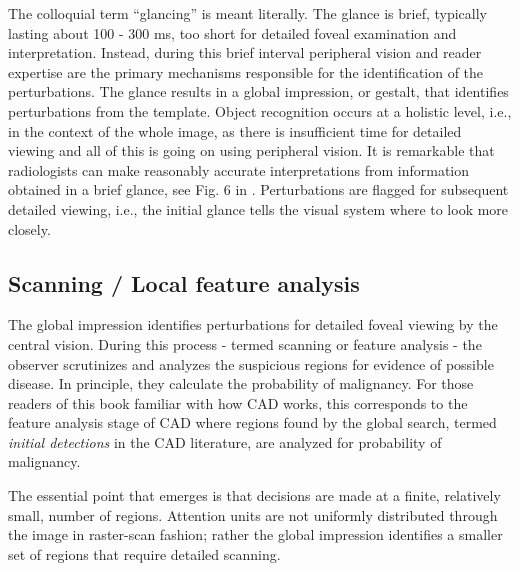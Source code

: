 \documentclass[
]{book}
\begin{document}
The colloquial term ``glancing'' is meant literally. The glance is brief, typically lasting about 100 - 300 ms, too short for detailed foveal examination and interpretation. Instead, during this brief interval peripheral vision and reader expertise are the primary mechanisms responsible for the identification of the perturbations. The glance results in a global impression, or gestalt, that identifies perturbations from the template. Object recognition occurs at a holistic level, i.e., in the context of the whole image, as there is insufficient time for detailed viewing and all of this is going on using peripheral vision. It is remarkable that radiologists can make reasonably accurate interpretations from information obtained in a brief glance, see Fig. 6 in \citep{nodine1987using}. Perturbations are flagged for subsequent detailed viewing, i.e., the initial glance tells the visual system where to look more closely.

\hypertarget{visual-search-scanning-local-feature-analysis}{%
\subsection{Scanning / Local feature analysis}\label{visual-search-scanning-local-feature-analysis}}

The global impression identifies perturbations for detailed foveal viewing by the central vision. During this process - termed scanning or feature analysis - the observer scrutinizes and analyzes the suspicious regions for evidence of possible disease. In principle, they calculate the probability of malignancy. For those readers of this book familiar with how CAD works, this corresponds to the feature analysis stage of CAD where regions found by the global search, termed \emph{initial detections} in the CAD literature, are analyzed for probability of malignancy.

The essential point that emerges is that decisions are made at a finite, relatively small, number of regions. Attention units are not uniformly distributed through the image in raster-scan fashion; rather the global impression identifies a smaller set of regions that require detailed scanning.
\end{document}
